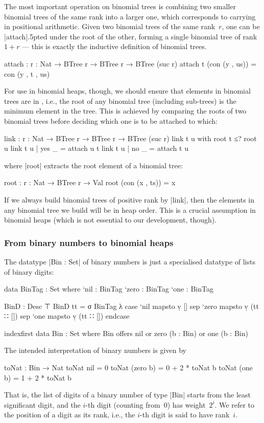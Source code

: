 The most important operation on binomial trees is combining two smaller binomial trees of the same rank into a larger one, which corresponds to carrying in positional arithmetic.
Given two binomial trees of the same rank~$r$, one can be |attach|{\kern.5pt}ed under the root of the other, forming a single binomial tree of rank $1+r$ --- this is exactly the inductive definition of binomial trees.
\begin{code}
attach : {r : Nat} → BTree r → BTree r → BTree (suc r)
attach t (con (y , us)) = con (y , t , us)
\end{code}
For use in binomial heaps, though, we should ensure that elements in binomial trees are in , i.e., the root of any binomial tree (including sub-trees) is the minimum element in the tree.
This is achieved by comparing the roots of two binomial trees before deciding which one is to be attached to which:
\begin{code}
link : {r : Nat} → BTree r → BTree r → BTree (suc r)
link t u with root t ≤? root u
link t u | yes  _ = attach u t
link t u | no   _ = attach t u
\end{code}
where |root| extracts the root element of a binomial tree:
\begin{code}
root : {r : Nat} → BTree r → Val
root (con (x , ts)) = x
\end{code}
If we always build binomial trees of positive rank by |link|, then the elements in any binomial tree we build will be in heap order.
This is a crucial assumption in binomial heaps (which is not essential to our development, though).

\subsubsection{From binary numbers to binomial heaps}
The datatype |Bin : Set| of binary numbers is just a specialised datatype of lists of binary digits:
\begin{code}
data BinTag : Set where
  `nil   : BinTag
  `zero  : BinTag
  `one   : BinTag

BinD : Desc ⊤
BinD tt = σ BinTag λ  case  `nil   mapsto  ṿ []
                      sep   `zero  mapsto  ṿ (tt ∷ [])
                      sep   `one   mapsto  ṿ (tt ∷ []) endcase

indexfirst data Bin : Set where
  Bin  offers  nil
       or      zero  (b : Bin)
       or      one   (b : Bin)
\end{code}
The intended interpretation of binary numbers is given by
\begin{code}
toNat : Bin → Nat
toNat nil        = 0
toNat (zero  b)  = 0 + 2 * toNat b
toNat (one   b)  = 1 + 2 * toNat b
\end{code}
That is, the list of digits of a binary number of type |Bin| starts from the least significant digit, and the $i$-th digit (counting from~$0$) has weight~$2^i$.
We refer to the position of a digit as its rank, i.e., the $i$-th digit is said to have rank~$i$.


